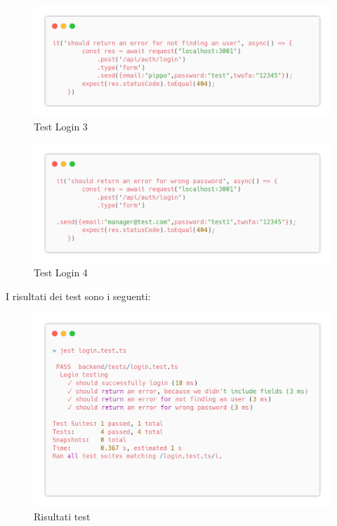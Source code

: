 \documentclass{report}
\begin{document}
\begin{figure}[H]
	\centering\includegraphics[width=1\textwidth]{images/microservizio-autenticazione/tests/login_test_3.png}
	\caption{Test Login 3}
\end{figure}
\begin{figure}[H]
	\centering\includegraphics[width=1\textwidth]{images/microservizio-autenticazione/tests/login_test_4.png}
	\caption{Test Login 4}
\end{figure}
I risultati dei test sono i seguenti:
\begin{figure}[H]
	\centering\includegraphics[width=1\textwidth]{images/microservizio-autenticazione/tests/login_test_results.png}
	\caption{Risultati test}
\end{figure}
\end{document}
